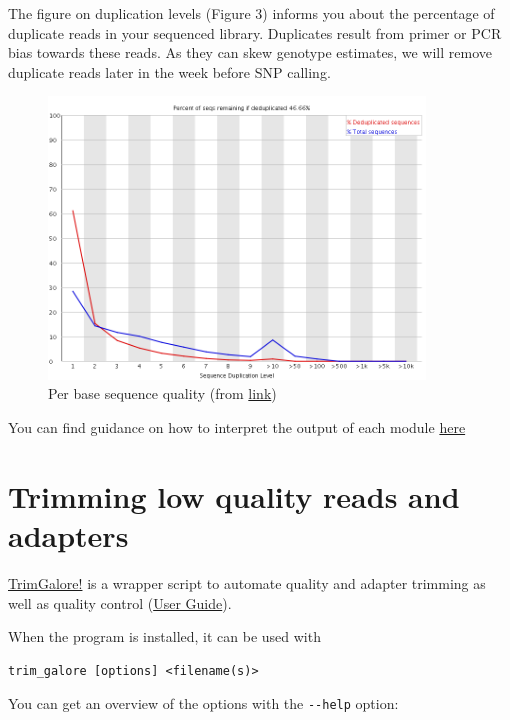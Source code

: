 \documentclass[11pt]{article}
\begin{document}
The figure on duplication levels (Figure 3) informs you about the
percentage of duplicate reads in your sequenced library.  Duplicates
result from primer or PCR bias towards these reads.  As they can skew
genotype estimates, we will remove duplicate reads later in the week
before SNP calling.

\begin{figure}[htb]
\centering
\includegraphics[width=10cm]{duplication_levels.png}
\caption{Per base sequence quality (from \href{http://www.bioinformatics.babraham.ac.uk/projects/fastqc/Help/3\%20Analysis\%20Modules/8\%20Duplicate\%20Sequences.html}{link})}
\end{figure}

You can find guidance on how to interpret the output of each module
\href{http://www.bioinformatics.babraham.ac.uk/projects/fastqc/Help/3\%20Analysis\%20Modules/}{here} 

\section{Trimming low quality reads and adapters}
\label{sec-3}
\href{http://www.bioinformatics.babraham.ac.uk/projects/trim_galore/}{TrimGalore!} is a wrapper script to automate quality and adapter
trimming as well as quality control (\href{http://www.bioinformatics.babraham.ac.uk/projects/trim_galore/trim_galore_User_Guide_v0.3.7.pdf}{User Guide}).

When the program is installed, it can be used with 

\begin{verbatim}
trim_galore [options] <filename(s)>
\end{verbatim}

You can get an overview of the options with the \texttt{-{}-help} option:
\end{document}
